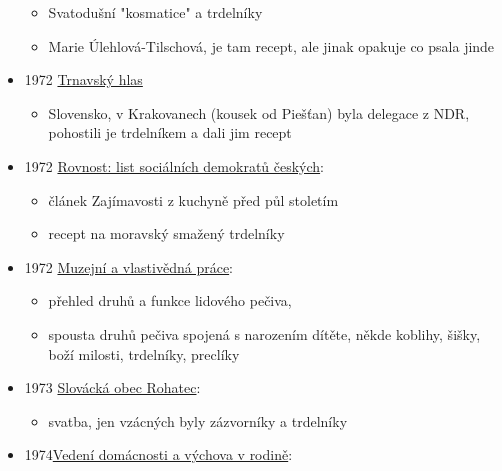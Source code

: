 \begin{itemize}
  \begin{itemize}
  \tightlist
  \item
    Svatodušní "kosmatice" a trdelníky
  \item
    Marie Úlehlová-Tilschová, je tam recept, ale jinak opakuje co psala
    jinde
  \end{itemize}
\item
  1972
  \href{https://dikda.snk.sk/uuid/uuid:0c6787b6-5b99-4d97-9642-caa75ca6d9be}{Trnavský
  hlas}

  \begin{itemize}
  \tightlist
  \item
    Slovensko, v Krakovanech (kousek od Piešťan) byla delegace z NDR,
    pohostili je trdelníkem a dali jim recept
  \end{itemize}
\item
  1972
  \href{https://ceskadigitalniknihovna.cz/view/uuid:aaca4510-b6b2-11ed-9ffb-5ef3fc9bb22f?page=uuid\%3Aea81fc20-c1fc-11ed-979d-5ef3fcdaa9a7&fulltext=trdeln\%C3\%ADk\%20OR\%20trdeln\%C3\%ADky\%20OR\%20trdeln\%C3\%ADk\%C5\%AF&source=mzk}{Rovnost:
  list sociálních demokratů českých}:

  \begin{itemize}
  \tightlist
  \item
    článek Zajímavosti z kuchyně před půl stoletím
  \item
    recept na moravský smažený trdelníky
  \end{itemize}
\item
  1972
  \href{https://ceskadigitalniknihovna.cz/uuid/uuid:f7dfd885-ee4d-4815-9bb8-26f566d50485}{Muzejní
  a vlastivědná práce}:

  \begin{itemize}
  \tightlist
  \item
    přehled druhů a funkce lidového pečiva,
  \item
    spousta druhů pečiva spojená s narozením dítěte, někde koblihy,
    šišky, boží milosti, trdelníky, preclíky
  \end{itemize}
\item
  1973
  \href{https://ceskadigitalniknihovna.cz/view/uuid:16e70800-3350-11e8-9dd8-005056827e51?page=uuid\%3Ab94f2080-53a5-11e8-946a-005056825209&fulltext=trdeln\%C3\%ADk\%20OR\%20trdeln\%C3\%ADky\%20OR\%20trdeln\%C3\%ADk\%C5\%AF&source=mzk}{Slovácká
  obec Rohatec}:

  \begin{itemize}
  \tightlist
  \item
    svatba, jen vzácných byly zázvorníky a trdelníky
  \end{itemize}
\item
  1974\href{https://ceskadigitalniknihovna.cz/view/uuid:01efbca0-9ed8-11e3-8e84-005056827e51?page=uuid\%3A605e51f0-a73b-11e3-87a3-001018b5eb5c&fulltext=trdeln\%C3\%ADk\%20OR\%20trdeln\%C3\%ADky\%20OR\%20trdeln\%C3\%ADk\%C5\%AF&source=mzk}{Vedení
  domácnosti a výchova v rodině}:


\end{itemize}
